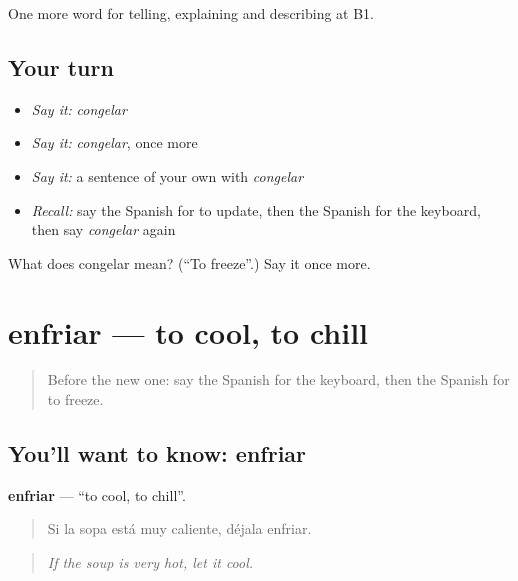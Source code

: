 \begin{grammarlens}[title={What you've built}]
One more word for telling, explaining and describing at B1.
\end{grammarlens}

\subsection*{Your turn}
\begin{itemize}
\raggedright
  \item \emph{Say it:} \emph{congelar}
  \item \emph{Say it:} \emph{congelar}, once more
  \item \emph{Say it:} a sentence of your own with \emph{congelar}
  \item \emph{Recall:} say the Spanish for to update, then the Spanish for the keyboard, then say \emph{congelar} again
\end{itemize}

\begin{tcolorbox}[breakable,colback=teal!4,colframe=teal!35!black,title={Before you move on}]
What does congelar mean? (\textquotedblleft{}To freeze\textquotedblright{}.) Say it once more.
\end{tcolorbox}
\section[enfriar]{enfriar — to cool, to chill}

\label{lesson:ES-C777-enfriar}



\begin{quote}
Before the new one: say the Spanish for the keyboard, then the Spanish for to freeze.
\end{quote}

\subsection*{You'll want to know: enfriar}
\textbf{enfriar} — \textquotedblleft{}to cool, to chill\textquotedblright{}.

\begin{quote}
Si la sopa está muy caliente, déjala enfriar.
\end{quote}

\begin{quote}
\emph{If the soup is very hot, let it cool.}
\end{quote}

